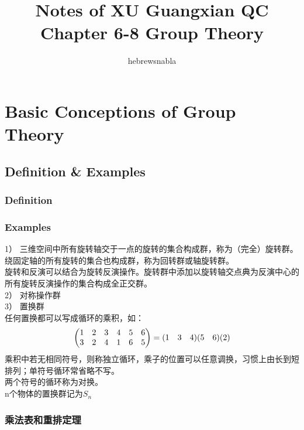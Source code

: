\documentclass[UTF8]{ctexart} %
\title{Notes of XU Guangxian QC\\
Chapter 6-8 Group Theory}
\author{hebrewsnabla}
\numberwithin{equation}{section}
\begin{document}
\maketitle
\setcounter{section}{5}
\section{Basic Conceptions of Group Theory}
\subsection{Definition \& Examples}
\subsubsection{Definition}
\subsubsection{Examples}
1） 三维空间中所有旋转轴交于一点的旋转的集合构成群，称为（完全）旋转群。\\
绕固定轴的所有旋转的集合也构成群，称为回转群或轴旋转群。\\
旋转和反演可以结合为旋转反演操作。旋转群中添加以旋转轴交点典为反演中心的所有旋转反演操作的集合构成全正交群。\\
2） 对称操作群\\
3） 置换群\\
任何置换都可以写成循环的乘积，如：\\
\begin{equation}\label{key}
\left(\mqty{1& 2& 3& 4& 5& 6\\
			3& 2& 4& 1& 6& 5}\right)
= (\mqty{1&3&4})(\mqty{5&6})(2)
\end{equation}
乘积中若无相同符号，则称独立循环，乘子的位置可以任意调换，习惯上由长到短排列；单符号循环常省略不写。\\
两个符号的循环称为对换。\\
n个物体的置换群记为$S_n$\\
\subsubsection{乘法表和重排定理}
\end{document}
